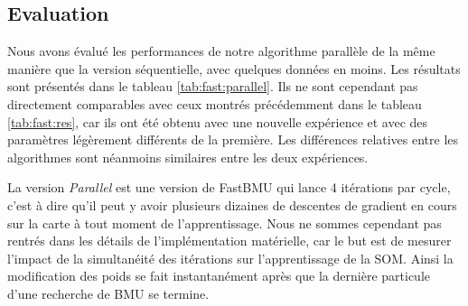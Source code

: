 	\subsection{Evaluation}

	Nous avons évalué les performances de notre algorithme parallèle de la même manière que la version séquentielle, avec quelques données en moins. Les résultats sont présentés dans le tableau \ref{tab:fast:parallel}. Ils ne sont cependant pas directement comparables avec ceux montrés précédemment dans le tableau \ref{tab:fast:res}, car ils ont été obtenu avec une nouvelle expérience et avec des paramètres légèrement différents de la première. Les différences relatives entre les algorithmes sont néanmoins similaires entre les deux expériences.

	La version \textit{Parallel} est une version de FastBMU qui lance 4 itérations par cycle, c'est à dire qu'il peut y avoir plusieurs dizaines de descentes de gradient en cours sur la carte à tout moment de l'apprentissage. Nous ne sommes cependant pas rentrés dans les détails de l'implémentation matérielle, car le but est de mesurer l'impact de la simultanéité des itérations sur l'apprentissage de la SOM. Ainsi la modification des poids se fait instantanément après que la dernière particule d'une recherche de BMU se termine.

